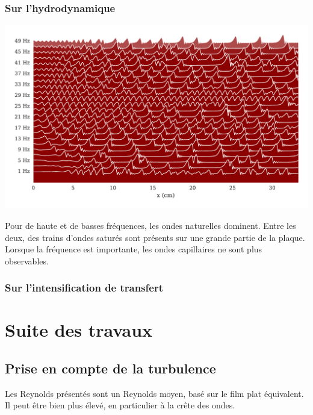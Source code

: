 \documentclass[a0,portrait]{a0poster}
\begin{document}
\begin{multicols}{2}
    \begin{multicols}{2}
        \subsubsection*{Sur l'hydrodynamique}

        \begin{center}
            \includegraphics[width=0.98\columnwidth]{01-frequency_effect}
            \label{fig:freq_effect}
        \end{center}

        Pour de haute et de basses fréquences, les ondes naturelles dominent. Entre les deux, des trains d'ondes saturés sont présents sur une grande partie de la plaque. Lorsque la fréquence est importante, les ondes capillaires ne sont plus observables.

        \columnbreak

        \subsubsection*{Sur l'intensification de transfert}
    \end{multicols}

    \section*{Suite des travaux}

    \begin{multicols}{2}
        \subsection*{Prise en compte de la turbulence}
        Les Reynolds présentés sont un Reynolds moyen, basé sur le film plat équivalent. Il peut être bien plus élevé, en particulier à la crête des ondes.


\end{multicols}
\end{multicols}
\end{document}
